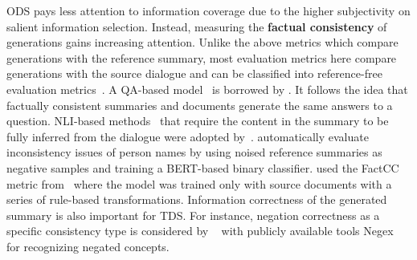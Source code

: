 ODS pays less attention to information coverage due to the higher subjectivity on salient information selection. Instead, measuring the \textbf{factual consistency} of generations gains increasing attention. Unlike the above metrics which compare generations with the reference summary, 
most evaluation metrics here compare generations with the source dialogue and can be classified into reference-free evaluation metrics~\cite{shao2017efficient,durmus2020feqa,egan2022play,liu2022reference}.
A QA-based model~\cite{wang2020asking} is borrowed by \citet{zhao2021give}.
It follows the idea that factually consistent summaries and documents generate the same answers to a question.
NLI-based methods~\cite{maynez2020faithfulness} that require the content in the summary to be fully inferred from the dialogue were adopted by~\citet{liu2022data}.
\citet{liu2021controllable} automatically evaluate {inconsistency} issues 
of person names by using noised reference summaries as negative samples and training a BERT-based binary classifier.
\citet{asi2022end} used the FactCC metric from~\citet{kryscinski2020evaluating} where the model was trained only with source documents with a series of rule-based transformations.
Information correctness of the generated summary is also important for TDS. For instance, negation correctness as a specific consistency type is considered by ~\citet{joshi2020dr} with 
publicly available tools Negex~\cite{harkema2009context} for recognizing 
negated concepts.

